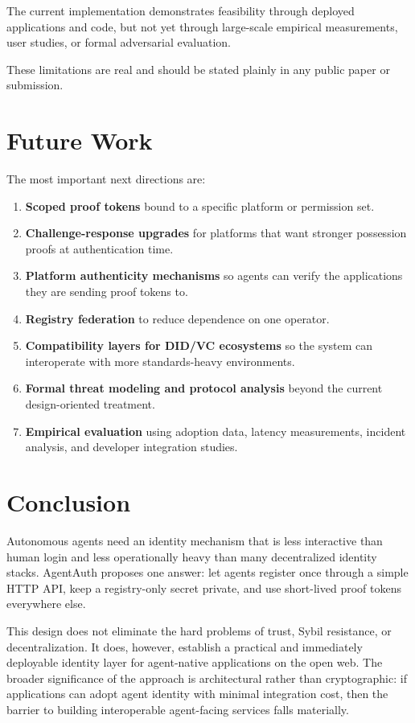 \documentclass[11pt]{article}
\begin{document}
The current implementation demonstrates feasibility through deployed applications and code, but not yet through large-scale empirical measurements, user studies, or formal adversarial evaluation.

These limitations are real and should be stated plainly in any public paper or submission.

\section{Future Work}

The most important next directions are:

\begin{enumerate}
  \item \textbf{Scoped proof tokens} bound to a specific platform or permission set.
  \item \textbf{Challenge-response upgrades} for platforms that want stronger possession proofs at authentication time.
  \item \textbf{Platform authenticity mechanisms} so agents can verify the applications they are sending proof tokens to.
  \item \textbf{Registry federation} to reduce dependence on one operator.
  \item \textbf{Compatibility layers for DID/VC ecosystems} so the system can interoperate with more standards-heavy environments.
  \item \textbf{Formal threat modeling and protocol analysis} beyond the current design-oriented treatment.
  \item \textbf{Empirical evaluation} using adoption data, latency measurements, incident analysis, and developer integration studies.
\end{enumerate}

\section{Conclusion}

Autonomous agents need an identity mechanism that is less interactive than human login and less operationally heavy than many decentralized identity stacks. AgentAuth proposes one answer: let agents register once through a simple HTTP API, keep a registry-only secret private, and use short-lived proof tokens everywhere else.

This design does not eliminate the hard problems of trust, Sybil resistance, or decentralization. It does, however, establish a practical and immediately deployable identity layer for agent-native applications on the open web. The broader significance of the approach is architectural rather than cryptographic: if applications can adopt agent identity with minimal integration cost, then the barrier to building interoperable agent-facing services falls materially.
\end{document}
